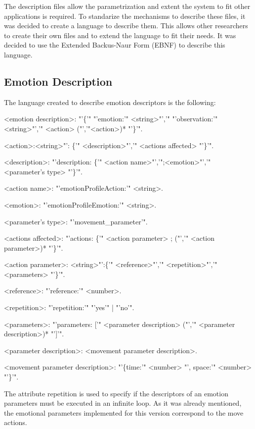 The description files allow the parametrization and extent the system to fit other applications is required. To standarize the mechanisms to describe these files, it was decided to create a language to describe them. This allows other researchers to create their own files and to extend the language to fit their needs. It was decided to use the Extended Backus-Naur Form (EBNF) to describe this language.
\subsection{Emotion Description} 
The language created to describe emotion descriptors is the following:
\begin{small}

\begingrammar
%		
<emotion description>: "'\{'" "'emotion:'" <string>"','" "'observation:'" <string>"','" <action> ("','"<action>)* "'\}'".

<action>:<string>"': \{'" <description>"','" <actions affected> "'\}'".

<description>: "'description: \{'" <action name>"','";<emotion>"','" <parameter's type> "'\}'".

<action name>: "'emotionProfileAction:'" <string>.

<emotion>: "'emotionProfileEmotion:'" <string>.

<parameter's type>: "'movement\_parameter'".

<actions affected>: "'actions: \{'" <action parameter> ; ("','" <action parameter>)* "'\}'".

<action parameter>: <string>"':\{'" <reference>"','" <repetition>"','" <parameters> "'\}'".

<reference>: "'reference:'" <number>.

<repetition>: "'repetition:'" "'yes'" | "'no'".

<parameters>: "'parameters: ['" <parameter description> ("','" <parameter description>)* "']'".

<parameter description>: <movement parameter description>.

<movement parameter description>: "'\{time:'" <number> "', space:'" <number> "'\}'".

\endgrammar
\end{small}
The attribute repetition is used to specify if the descriptors of an emotion parameters must be executed in an infinite loop. As it was already mentioned, the emotional parameters implemented for this version correspond to the move actions.

